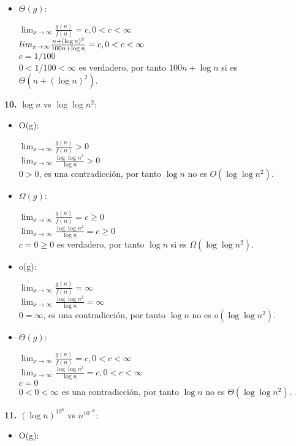 \documentclass{article}
\begin{document}
\begin{enumerate}[label=\textbf{\alph*.}]
\begin{itemize}
      \item $\Theta(g)$:
      
        $\lim_{x\to\infty} \frac{g(n)}{f(n)}=c,0<c<\infty$\\
        $\\lim_{x\to\infty} \frac{n+(\log n)^2}{100n+\log n}=c,0<c<\infty$\\
        $c=1/100$\\
        $0<1/100<\infty$ es verdadero, por tanto $100n+\log n$ si es $\Theta(n+(\log n)^2)$.
    \end{itemize}
  
  \textbf{10.} $\log n$ vs $\log \log n^2$:
    \begin{itemize}
      \item O(g):
      
        $\lim_{x\to\infty} \frac{g(n)}{f(n)}>0$\\
        $\lim_{x\to\infty} \frac{\log \log n^2}{\log n}>0$\\
        $0>0$, es una contradicción, por tanto $\log n$ no es $O(\log \log n^2)$.
      \item $\Omega(g)$:
      
        $\lim_{x\to\infty} \frac{g(n)}{f(n)}=c \geq 0$\\
        $\lim_{x\to\infty} \frac{\log \log n^2}{\log n}=c \geq 0$\\
        $c=0 \geq 0$ es verdadero, por tanto $\log n$ si es $\Omega(\log \log n^2)$.
      \item o(g):
      
        $\lim_{x\to\infty} \frac{g(n)}{f(n)}=\infty$\\
        $\lim_{x\to\infty} \frac{\log \log n^2}{\log n}=\infty$\\
        $0=\infty$, es una contradicción, por tanto $\log n$ no es $o(\log \log n^2)$.
      \item $\Theta(g)$:
      
        $\lim_{x\to\infty} \frac{g(n)}{f(n)}=c,0<c<\infty$\\
        $\lim_{x\to\infty} \frac{\log \log n^2}{\log n}=c,0<c<\infty$\\
        $c=0$\\
	$0<0<\infty$ es una contradicción, por tanto $\log n$ no es $\Theta(\log \log n^2)$.
    \end{itemize}
  
  \textbf{11.} $(\log n)^{10^6}$ vs $n^{10^{-6}}$:
    \begin{itemize}
      \item O(g):
      

\end{itemize}
\end{enumerate}
\end{document}
